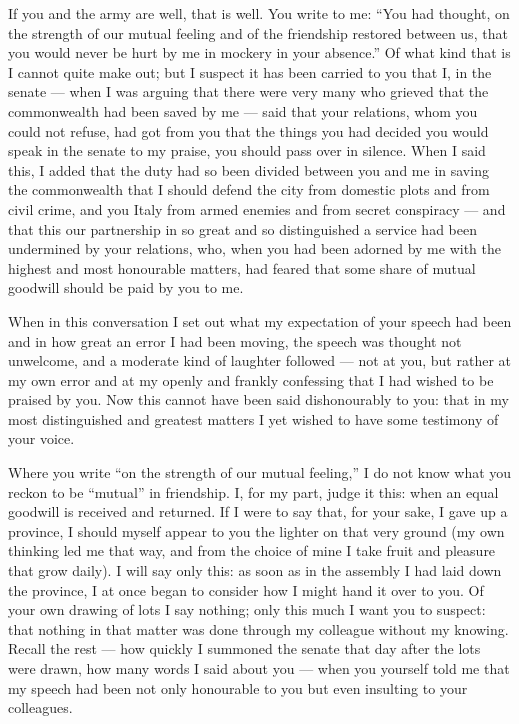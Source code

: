 

 If you and the army are well, that is well. You write to me: ``You had thought, on the strength of our mutual feeling and of the friendship restored between us, that you would never be hurt by me in mockery in your absence.'' Of what kind that is I cannot quite make out; but I suspect it has been carried to you that I, in the senate --- when I was arguing that there were very many who grieved that the commonwealth had been saved by me --- said that your relations, whom you could not refuse, had got from you that the things you had decided you would speak in the senate to my praise, you should pass over in silence. When I said this, I added that the duty had so been divided between you and me in saving the commonwealth that I should defend the city from domestic plots and from civil crime, and you Italy from armed enemies and from secret conspiracy --- and that this our partnership in so great and so distinguished a service had been undermined by your relations, who, when you had been adorned by me with the highest and most honourable matters, had feared that some share of mutual goodwill should be paid by you to me.

 When in this conversation I set out what my expectation of your speech had been and in how great an error I had been moving, the speech was thought not unwelcome, and a moderate kind of laughter followed --- not at you, but rather at my own error and at my openly and frankly confessing that I had wished to be praised by you. Now this cannot have been said dishonourably to you: that in my most distinguished and greatest matters I yet wished to have some testimony of your voice.

 Where you write ``on the strength of our mutual feeling,'' I do not know what you reckon to be ``mutual'' in friendship. I, for my part, judge it this: when an equal goodwill is received and returned. If I were to say that, for your sake, I gave up a province, I should myself appear to you the lighter on that very ground (my own thinking led me that way, and from the choice of mine I take fruit and pleasure that grow daily). I will say only this: as soon as in the assembly I had laid down the province, I at once began to consider how I might hand it over to you. Of your own drawing of lots I say nothing; only this much I want you to suspect: that nothing in that matter was done through my colleague without my knowing. Recall the rest --- how quickly I summoned the senate that day after the lots were drawn, how many words I said about you --- when you yourself told me that my speech had been not only honourable to you but even insulting to your colleagues.

